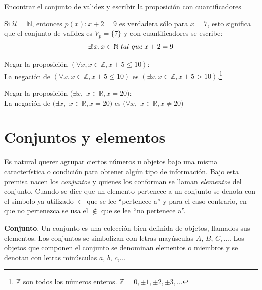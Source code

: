 \begin{myexample}
Encontrar el conjunto de validez y escribir la proposición con cuantificadores
\end{myexample}
Si $\mathcal{U}=\mathbb{N}$, entonces $p(x):x+2=9$ es verdadera sólo para $x=7$, esto significa que el conjunto de validez es $V_{p}=\{7\}$ y con cuantificadores se escribe:
\begin{equation}
\exists!x,x\in\mathbb{N}\hspace{3px}tal\hspace{3px}que\hspace{3px}x+2=9
\end{equation}

\begin{myexample}
Negar la proposición  $(\forall x,x\in \mathbb{Z},x+5\leq 10)$: \\

La negación de $(\forall x,x\in \mathbb{Z},x+5\leq 10)$ es $(\exists x,x\in \mathbb{Z},x+5>10)$.\footnote{$\mathbb{Z}$ son todos los números enteros. $\mathbb{Z}=0,\pm 1,\pm 2, \pm 3,...$}
\end{myexample}

\begin{myexample}
Negar la proposición  $(\exists x,$ $x\in\mathbb{R}, x=20)$: \\

La negación de $(\exists x,$ $x\in\mathbb{R}, x=20)$ es  $(\forall x,$ $x\in\mathbb{R}, x\neq 20)$
\end{myexample}
\newpage
\section{Conjuntos y elementos}
\label{CyE}

Es natural querer agrupar ciertos números u objetos bajo una misma característica o condición para obtener algún tipo de información. Bajo esta premisa nacen los \textit{conjuntos} y quienes los conforman se llaman \textit{elementos} del conjunto. Cuando se dice que un elemento pertenece a un conjunto se denota con el símbolo ya utilizado $\in$ que se lee ``pertenece a'' y para el caso contrario, en que no pertenezca se usa el $\notin$ que se lee ``no pertenece a''.

\begin{mydef}
\textbf{Conjunto}. Un conjunto es una colección bien definida de objetos, llamados sus elementos. Los conjuntos se simbolizan con letras mayúsculas $A$, $B$, $C,...$. Los objetos que componen el conjunto se denominan elementos o miembros y se denotan con letras minúsculas $a$, $b$, $c$,$...$
\end{mydef}

